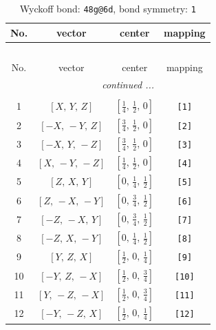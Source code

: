 \documentclass[fleqn,8pt]{jsarticle}
\begin{document}
\begin{longtable}{cccc}
\caption{Wyckoff bond: {\tt 48g@6d}, bond symmetry: {\tt 1}}
 \\
 \hline \hline
No. & vector & center & mapping \\ \hline \endfirsthead

\multicolumn{3}{l}{\tablename\ \thetable{}} \\
 \hline \hline
No. & vector & center & mapping \\ \hline \endhead

 \hline \hline
\multicolumn{3}{r}{\footnotesize\it continued ...} \\ \endfoot

 \hline \hline
\multicolumn{3}{r}{} \\ \endlastfoot

1 & $\left[ X,\, Y,\, Z \right]$ & $\left[ \frac{1}{4},\, \frac{1}{2},\, 0 \right]$ & {\tt [1]} \\ \hline
2 & $\left[ - X,\, - Y,\, Z \right]$ & $\left[ \frac{3}{4},\, \frac{1}{2},\, 0 \right]$ & {\tt [2]} \\ \hline
3 & $\left[ - X,\, Y,\, - Z \right]$ & $\left[ \frac{3}{4},\, \frac{1}{2},\, 0 \right]$ & {\tt [3]} \\ \hline
4 & $\left[ X,\, - Y,\, - Z \right]$ & $\left[ \frac{1}{4},\, \frac{1}{2},\, 0 \right]$ & {\tt [4]} \\ \hline
5 & $\left[ Z,\, X,\, Y \right]$ & $\left[ 0,\, \frac{1}{4},\, \frac{1}{2} \right]$ & {\tt [5]} \\ \hline
6 & $\left[ Z,\, - X,\, - Y \right]$ & $\left[ 0,\, \frac{3}{4},\, \frac{1}{2} \right]$ & {\tt [6]} \\ \hline
7 & $\left[ - Z,\, - X,\, Y \right]$ & $\left[ 0,\, \frac{3}{4},\, \frac{1}{2} \right]$ & {\tt [7]} \\ \hline
8 & $\left[ - Z,\, X,\, - Y \right]$ & $\left[ 0,\, \frac{1}{4},\, \frac{1}{2} \right]$ & {\tt [8]} \\ \hline
9 & $\left[ Y,\, Z,\, X \right]$ & $\left[ \frac{1}{2},\, 0,\, \frac{1}{4} \right]$ & {\tt [9]} \\ \hline
10 & $\left[ - Y,\, Z,\, - X \right]$ & $\left[ \frac{1}{2},\, 0,\, \frac{3}{4} \right]$ & {\tt [10]} \\ \hline
11 & $\left[ Y,\, - Z,\, - X \right]$ & $\left[ \frac{1}{2},\, 0,\, \frac{3}{4} \right]$ & {\tt [11]} \\ \hline
12 & $\left[ - Y,\, - Z,\, X \right]$ & $\left[ \frac{1}{2},\, 0,\, \frac{1}{4} \right]$ & {\tt [12]} \\ \hline

\end{longtable}
\end{document}
